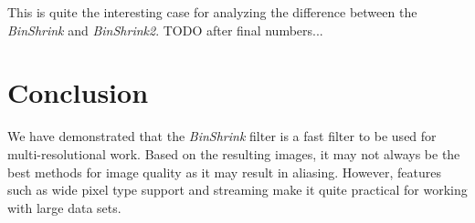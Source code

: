 \documentclass{InsightArticle}
\begin{document}
This is quite the interesting case for analyzing the difference
between the \textit{BinShrink} and \textit{BinShrink2}. TODO after
final numbers...

\section{Conclusion}

We have demonstrated that the \textit{BinShrink} filter is a fast
filter to be used for multi-resolutional work. Based on the resulting
images, it may not always be the best methods for image quality as it
may result in aliasing. However, features such as wide pixel type
support and streaming make it quite practical for working with large
data sets.




\end{document}
